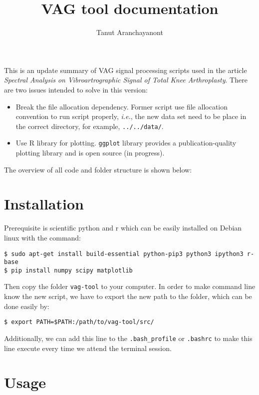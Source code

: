 \documentclass{article}
\author{Tanut Aranchayanont}
\title{VAG tool documentation}
\begin{document}
\maketitle

This is an update summary of VAG signal processing scripts used in the article \emph{Spectral Analysis on Vibroartrographic Signal of Total Knee Arthroplasty}. There are two issues intended to solve in this version:
\begin{itemize}
  \item Break the file allocation dependency. Former script use file allocation convention to run script properly, \emph{i.e.}, the new data set need to be place in the correct directory, for example, \texttt{../../data/}.
  \item Use R library for plotting. \texttt{ggplot} library provides a publication-quality plotting library and is open source (in progress).
\end{itemize}
The overview of all code and folder structure is shown below:

\section*{Installation}
Prerequisite is scientific python and r which can be easily installed on Debian linux with the command:
\begin{verbatim}
$ sudo apt-get install build-essential python-pip3 python3 ipython3 r-base
$ pip install numpy scipy matplotlib
\end{verbatim}
Then copy the folder \texttt{vag-tool} to your computer. In order to make command line know the new script, we have to export the new path to the folder, which can be done easily by:
\begin{verbatim}
$ export PATH=$PATH:/path/to/vag-tool/src/
\end{verbatim}
Additionally, we can add this line to the \texttt{.bash\_profile} or \texttt{.bashrc} to make this line execute every time we attend the terminal session.

\section*{Usage}
\end{document}
